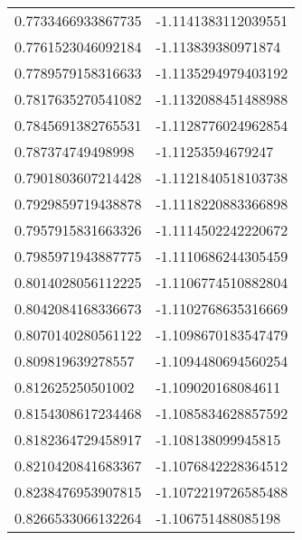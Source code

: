 \begin{supertabular}{ll}
0.7733466933867735  & -1.1141383112039551   \\
0.7761523046092184  & -1.113839380971874    \\
0.7789579158316633  & -1.1135294979403192   \\
0.7817635270541082  & -1.1132088451488988   \\
0.7845691382765531  & -1.1128776024962854   \\
0.787374749498998   & -1.11253594679247     \\
0.7901803607214428  & -1.1121840518103738   \\
0.7929859719438878  & -1.1118220883366898   \\
0.7957915831663326  & -1.1114502242220672   \\
0.7985971943887775  & -1.1110686244305459   \\
0.8014028056112225  & -1.1106774510882804   \\
0.8042084168336673  & -1.1102768635316669   \\
0.8070140280561122  & -1.1098670183547479   \\
0.809819639278557   & -1.1094480694560254   \\
0.812625250501002   & -1.109020168084611    \\
0.8154308617234468  & -1.1085834628857592   \\
0.8182364729458917  & -1.108138099945815    \\
0.8210420841683367  & -1.1076842228364512   \\
0.8238476953907815  & -1.1072219726585488   \\
0.8266533066132264  & -1.106751488085198    \\
\end{supertabular}
